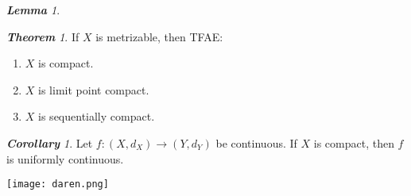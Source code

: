 \documentclass[frenchspacing,9pt,landscape,a4paper]{article}
\theoremstyle{remark}
\newtheorem*{thm}{\textbf{Theorem}}
\newtheorem*{lem}{\textbf{Lemma}}
\newtheorem*{cor}{\textbf{Corollary}}
\begin{document}
\begin{multicols}{4}
\begin{lem}
\end{lem}
\begin{thm}
    If $X$ is metrizable, then TFAE:
     \begin{enumerate}
         \item $X$ is compact.
         \item  $X$ is limit point compact.
         \item  $X$ is sequentially compact.
    \end{enumerate}
\end{thm}
\begin{cor}
    Let $f:(X,d_X)\to(Y,d_Y)$ be continuous. If  $X$ is compact, then  $f$ is uniformly continuous.
\end{cor}
\texttt{[image: daren.png]}
\end{multicols}
\end{document}
